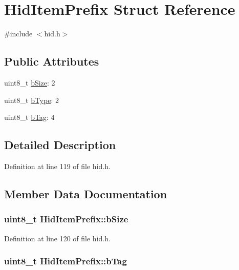 \hypertarget{struct_hid_item_prefix}{\section{\-Hid\-Item\-Prefix \-Struct \-Reference}
\label{struct_hid_item_prefix}
}


{\ttfamily \#include $<$hid.\-h$>$}

\subsection*{\-Public \-Attributes}
\begin{DoxyCompactItemize}
\item 
uint8\-\_\-t \hyperlink{struct_hid_item_prefix_a4b0af0a3d7ac50bdbedcd5fae929200d}{b\-Size}\-: 2
\item 
uint8\-\_\-t \hyperlink{struct_hid_item_prefix_a16874c73fdb809e4c46407ca83684927}{b\-Type}\-: 2
\item 
uint8\-\_\-t \hyperlink{struct_hid_item_prefix_a9c8a256ca8e493adfce8772445fef01e}{b\-Tag}\-: 4
\end{DoxyCompactItemize}


\subsection{\-Detailed \-Description}


\-Definition at line 119 of file hid.\-h.



\subsection{\-Member \-Data \-Documentation}
\hypertarget{struct_hid_item_prefix_a4b0af0a3d7ac50bdbedcd5fae929200d}{
\subsubsection[{b\-Size}]{\setlength{\rightskip}{0pt plus 5cm}uint8\-\_\-t {\bf \-Hid\-Item\-Prefix\-::b\-Size}}}\label{struct_hid_item_prefix_a4b0af0a3d7ac50bdbedcd5fae929200d}


\-Definition at line 120 of file hid.\-h.

\hypertarget{struct_hid_item_prefix_a9c8a256ca8e493adfce8772445fef01e}{
\subsubsection[{b\-Tag}]{\setlength{\rightskip}{0pt plus 5cm}uint8\-\_\-t {\bf \-Hid\-Item\-Prefix\-::b\-Tag}}}\label{struct_hid_item_prefix_a9c8a256ca8e493adfce8772445fef01e}


